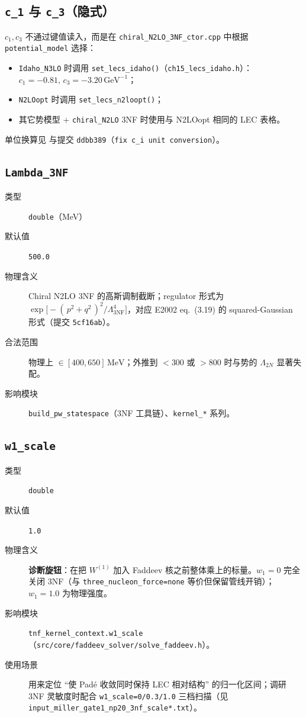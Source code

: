 \subsection{\texttt{c\_1} 与 \texttt{c\_3}（隐式）}

\(c_1, c_3\) 不通过键值读入，而是在 \texttt{chiral\_N2LO\_3NF\_ctor.cpp} 中根据 \texttt{potential\_model} 选择：
\begin{itemize}
  \item \texttt{Idaho\_N3LO} 时调用 \texttt{set\_lecs\_idaho()}（\texttt{ch15\_lecs\_idaho.h}）：\(c_1=-0.81,\,c_3=-3.20\,\mathrm{GeV}^{-1}\)；
  \item \texttt{N2LOopt} 时调用 \texttt{set\_lecs\_n2loopt()}；
  \item 其它势模型 + \texttt{chiral\_N2LO} 3NF 时使用与 N2LOopt 相同的 LEC 表格。
\end{itemize}
单位换算见 \cite{Navratil2007} 与提交 \texttt{ddbb389}（\texttt{fix c\_i unit conversion}）。

\subsection{\texttt{Lambda\_3NF}}

\begin{description}
  \item[类型] \texttt{double}（\si{MeV}）
  \item[默认值] \texttt{500.0}
  \item[物理含义] Chiral N2LO 3NF 的高斯调制截断；regulator 形式为 \(\exp\!\big[-(\,p^2+q^2\,)^{2}/\Lambda_{3\mathrm{NF}}^4\big]\)，对应 E2002 eq.~(3.19) 的 squared-Gaussian 形式（提交 \texttt{5cf16ab}）。
  \item[合法范围] 物理上 \(\in[400,650]\,\mathrm{MeV}\)；外推到 \(<300\) 或 \(>800\) 时与势的 \(\Lambda_{2N}\) 显著失配。
  \item[影响模块] \texttt{build\_pw\_statespace}（3NF 工具链）、\texttt{kernel\_*} 系列。
\end{description}

\subsection{\texttt{w1\_scale}}

\begin{description}
  \item[类型] \texttt{double}
  \item[默认值] \texttt{1.0}
  \item[物理含义] \textbf{诊断旋钮}：在把 \(W^{(1)}\) 加入 Faddeev 核之前整体乘上的标量。\(w_1=0\) 完全关闭 3NF（与 \texttt{three\_nucleon\_force=none} 等价但保留管线开销）；\(w_1=1.0\) 为物理强度。
  \item[影响模块] \texttt{tnf\_kernel\_context.w1\_scale}（\texttt{src/core/faddeev\_solver/solve\_faddeev.h}）。
  \item[使用场景] 用来定位 “使 Padé 收敛同时保持 LEC 相对结构” 的归一化区间；调研 3NF 灵敏度时配合 \texttt{w1\_scale=0/0.3/1.0} 三档扫描（见 \texttt{input\_miller\_gate1\_np20\_3nf\_scale*.txt}）。
\end{description}

